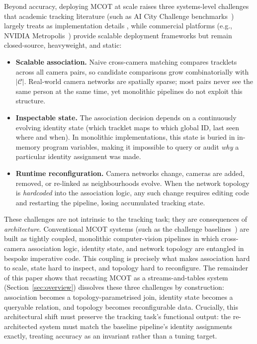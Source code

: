 \documentclass[5p,times]{elsarticle}
\begin{document}
Beyond accuracy, deploying MCOT at scale raises three systems-level challenges that academic tracking literature (such as AI City Challenge benchmarks~\cite{wang2024aicity}) largely treats as implementation details 
, while commercial platforms (e.g., NVIDIA Metropolis~\cite{nvidia2025metropolis}) provide scalable deployment frameworks but remain closed-source, heavyweight, and static:

\begin{itemize}[leftmargin=*]
    \item \textbf{Scalable association.} Naive cross-camera matching compares tracklets across all camera pairs, so candidate comparisons grow combinatorially with $|\mathcal{C}|$. Real-world camera networks are spatially sparse; most pairs never see the same person at the same time, yet monolithic pipelines do not exploit this structure.
    \item \textbf{Inspectable state.} The association decision depends on a continuously evolving identity state (which tracklet maps to which global ID, last seen where and when). In monolithic implementations, this state is buried in in-memory program variables, making it impossible to query or audit \emph{why} a particular identity assignment was made.
    \item \textbf{Runtime reconfiguration.} Camera networks change, cameras are added, removed, or re-linked as neighbourhoods evolve. When the network topology is \emph{hardcoded} into the association logic, any such change requires editing code and restarting the pipeline, losing accumulated tracking state.
\end{itemize}

These challenges are not intrinsic to the tracking task; they are consequences of \emph{architecture}. Conventional MCOT systems (such as the challenge baselines~\cite{yoshida2024overlap,specker2024ocmctrack,yang2024online}) %
are built as tightly coupled, monolithic computer-vision pipelines in which cross-camera association logic, identity state, and network topology are entangled in bespoke imperative code. This coupling is precisely what makes association hard to scale, state hard to inspect, and topology hard to reconfigure. The remainder of this paper shows that recasting MCOT as a streams-and-tables system (Section~\ref{sec:overview}) dissolves these three challenges by construction: association becomes a topology-parametrised join, identity state becomes a queryable relation, and topology becomes reconfigurable data. Crucially, this architectural shift must preserve the tracking task's functional output: the re-architected system must match the baseline pipeline's identity assignments exactly, treating accuracy as an invariant rather than a tuning target.
\end{document}
